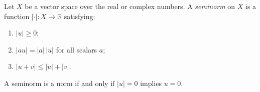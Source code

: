 Let $X$ be a vector space over the real or complex numbers. A \emph{seminorm} on $X$ is a function $|\cdot|: X \to \mathbb{R}$ satisfying:
\begin{enumerate}
\item $|u| \geq 0$;
\item $|a u| = |a| \, |u|$ for all scalars $a$;
\item $|u + v| \leq |u| + |v|$.
\end{enumerate}
A seminorm is a norm if and only if $|u| = 0$ implies $u = 0$.
